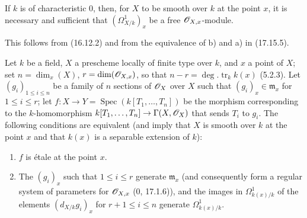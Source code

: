 \begin{corollary}[17.15.7]
\label{IV.17.15.7}
If $k$ is of characteristic 0, then, for $X$ to be smooth over $k$ at the point $x$, it is necessary and sufficient that $(\Omega^1_{X/k})_x$ be a free $\mathscr{O}_{X,x}$-module.
\end{corollary}

This follows from (16.12.2) and from the equivalence of b) and a) in (17.15.5).

\begin{proposition}[17.15.8]
\label{IV.17.15.8}
Let $k$ be a field, $X$ a prescheme locally of finite type over $k$, and $x$ a point of $X$; set $n=\dim_x(X)$, $r=\dim(\mathscr{O}_{X,x})$, so that $n-r=\deg.\operatorname{tr}_k k(x)$ (5.2.3). Let $(g_i)_{1\leq i\leq n}$ be a family of $n$ sections of $\mathscr{O}_X$ over $X$ such that $(g_i)_x\in\mathfrak m_x$ for $1\leq i\leq r$; let $f:X\to Y=\operatorname{Spec}(k[T_1,\ldots,T_n])$ be the morphism corresponding to the $k$-homomorphism $k[T_1,\ldots,T_n]\to\Gamma(X,\mathscr{O}_X)$ that sends $T_i$ to $g_i$. The following conditions are equivalent (and imply that $X$ is smooth over $k$ at the point $x$ and that $k(x)$ is a separable extension of $k$):
\begin{enumerate}
  \item[a)] $f$ is étale at the point $x$.


  \item[b)] The $(g_i)_x$ such that $1\leq i\leq r$ generate $\mathfrak m_x$ (and consequently form a regular system of parameters for $\mathscr{O}_{X,x}$ (0, 17.1.6)), and the images in $\Omega^1_{k(x)/k}$ of the elements $(d_{X/k}g_i)_x$ for $r+1\leq i\leq n$ generate $\Omega^1_{k(x)/k}$.
\end{enumerate}
\end{proposition}

